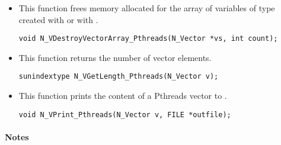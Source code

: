 \begin{itemize}

\item {}

 This function frees memory allocated for the array of  variables of type
  created with  or with
 .

 

 \verb|void N_VDestroyVectorArray_Pthreads(N_Vector *vs, int count);|


\item {}

 This function returns the number of vector elements.

 
 
 \verb|sunindextype N_VGetLength_Pthreads(N_Vector v);|


\item {}

 This function prints the content of a Pthreads vector to .

 
 
 \verb|void N_VPrint_Pthreads(N_Vector v, FILE *outfile);|

\end{itemize}
\paragraph{\bf Notes}                                                      
           
